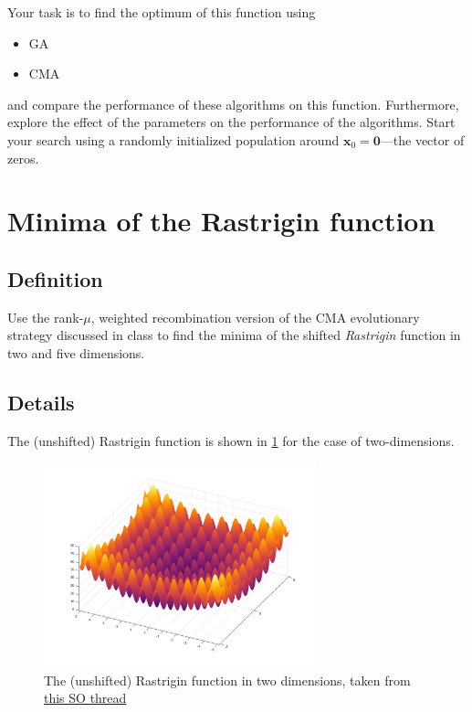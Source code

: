 \documentclass[11pt]{article}
\begin{document}
Your task is to find the optimum of this function using
\begin{itemize}
\item GA
\item CMA
\end{itemize}
and compare the performance of these algorithms on this function. Furthermore,
explore the effect of the parameters on the performance of the algorithms.
Start your search using a randomly initialized population around \(\mathbf{x}_0 = \mathbf{0}\)---the vector of zeros.

\section{Minima of the Rastrigin function}
\label{sec:org54222d7}
\subsection{Definition}
\label{sec:org52aa3fa}
  Use the rank-\(\mu\), weighted recombination version of the CMA
evolutionary strategy discussed in class to find the minima of the shifted
\emph{Rastrigin} function in two and five dimensions.

\subsection{Details}
\label{sec:orge844049}
The (unshifted) Rastrigin function is shown in \cref{rastr} for the case of two-dimensions.

\begin{figure}[htbp]
\centering
\includegraphics[width=0.7\textwidth]{images/rastrigin.png}
\caption{\label{rastr}
The (unshifted) Rastrigin function in two dimensions, taken from \href{https://stackoverflow.com/a/43112733}{this SO thread}}
\end{figure}
\end{document}
